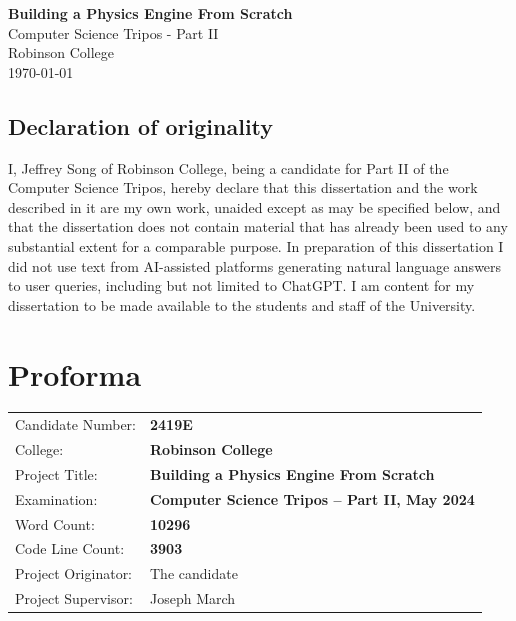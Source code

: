 \documentclass[12pt,a4paper,twoside,openright]{report}
\begin{document}

\pagestyle{empty}
\vspace*{60mm}
\begin{center}
\Huge
\textbf{Building a Physics Engine From Scratch} \\[5mm]
Computer Science Tripos - Part II \\[5mm]
Robinson College \\[5mm]
\today %
\end{center}

\newpage
\section*{Declaration of originality}
I, Jeffrey Song of Robinson College, being a candidate for Part II of the Computer Science Tripos, hereby declare that this dissertation and the work described in it are my own work, unaided except as may be specified below, and that the dissertation does not contain material that has already been used to any substantial extent for a comparable purpose. In preparation of this dissertation I did not use text from AI-assisted platforms generating natural language answers to user queries, including but not limited to ChatGPT. I am content for my dissertation to be made available to the students and staff of the University.
\bigskip
{}
\medskip
{}

\pagestyle{plain}
\chapter*{Proforma}
{\large
\begin{tabular}{ll}
Candidate Number: & \bf 2419E \\
College: & \bf Robinson College \\
Project Title: & \bf Building a Physics Engine From Scratch \\
Examination: & \bf Computer Science Tripos -- Part II, May 2024 \\
Word Count: & \bf 10296\footnotemark[1] \\
Code Line Count: & \bf3903\footnotemark[2] \\
Project Originator: & The candidate \\
Project Supervisor: & Joseph March \\
\end{tabular}
}
\end{document}
